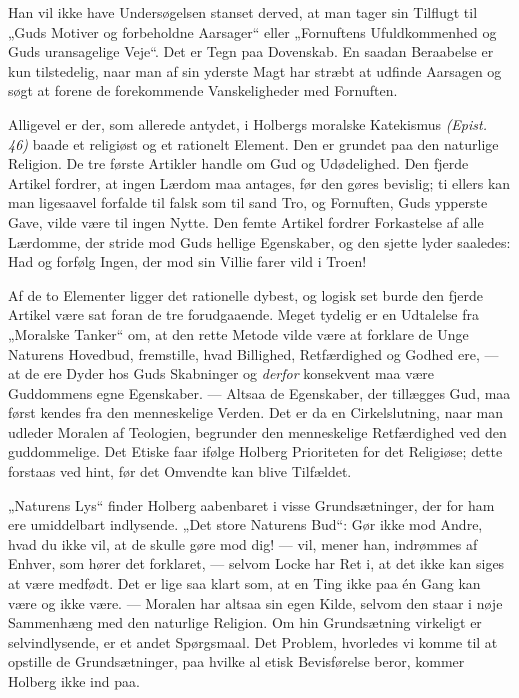 \documentclass[12pt,a4paper,openany]{book}
\newcommand{\opage}[1]{\marginnote{\footnotesize\textit{[#1]}}}
\begin{document}
Han vil ikke have Undersøgelsen stanset derved, at man
\setcounter{footnote}{0}%
\opage{10}tager sin Tilflugt til „Guds Motiver og forbeholdne Aarsager“ eller
„Fornuftens Ufuldkommenhed og Guds uransagelige Veje“. Det er Tegn paa
Dovenskab. En saadan Beraabelse er kun tilstedelig, naar man af sin yderste
Magt har stræbt at udfinde Aarsagen og søgt at forene de forekommende
Vanskeligheder med Fornuften.

Alligevel er der, som allerede antydet, i Holbergs moralske Katekismus
\textit{(Epist. 46)} baade et religiøst og et rationelt Element. Den er grundet
paa den naturlige Religion. De tre første Artikler handle om Gud og
Udødelighed. Den fjerde Artikel fordrer, at ingen Lærdom maa antages, før den
gøres bevislig; ti ellers kan man ligesaavel forfalde til falsk som til sand
Tro, og Fornuften, Guds ypperste Gave, vilde være til ingen Nytte. Den femte
Artikel fordrer Forkastelse af alle Lærdomme, der stride mod Guds hellige
Egenskaber, og den sjette lyder saaledes: Had og forfølg Ingen, der mod sin
Villie farer vild i Troen!

Af de to Elementer ligger det rationelle dybest, og logisk set burde den fjerde
Artikel være sat foran de tre forudgaaende. Meget tydelig er en Udtalelse fra
„Moralske Tanker“ om, at den rette Metode vilde være at forklare de Unge
Naturens Hovedbud, fremstille, hvad Billighed, Retfærdighed og Godhed ere, ---
at de ere Dyder hos Guds Skabninger og \textit{derfor} konsekvent maa være
Guddommens egne Egenskaber. --- Altsaa de Egenskaber, der tillægges Gud, maa
først kendes fra den menneskelige Verden. Det er da en Cirkelslutning, naar man
udleder Moralen af Teologien, begrunder den menneskelige Retfærdighed ved den
guddommelige. Det Etiske faar ifølge Holberg Prioriteten for det Religiøse;
dette forstaas ved hint, før det Omvendte kan blive Tilfældet.

„Naturens Lys“ finder Holberg aabenbaret i visse Grundsætninger, der for ham
ere umiddelbart indlysende. „Det store Naturens Bud“: Gør ikke mod Andre, hvad
du ikke vil, at de skulle gøre mod dig! --- vil, mener han, indrømmes af
Enhver, som hører det forklaret, --- selvom Locke har Ret i, at det ikke kan
siges at være medfødt. Det er lige%
\setcounter{footnote}{0}%
\opage{11}saa klart som, at en Ting ikke paa én Gang kan være og ikke være. ---
Moralen har altsaa sin egen Kilde, selvom den staar i nøje Sammenhæng med den
naturlige Religion. Om hin Grundsætning virkeligt er selvindlysende, er et
andet Spørgsmaal. Det Problem, hvorledes vi komme til at opstille de
Grundsætninger, paa hvilke al etisk Bevisførelse beror, kommer Holberg ikke ind paa.
\end{document}
